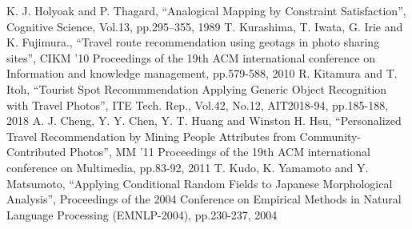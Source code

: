 \documentclass{deimj}
\begin{document}
\begin{thebibliography}{99}
  K. J. Holyoak and P. Thagard,
    ``Analogical Mapping by Constraint Satisfaction'',
    Cognitive Science, Vol.13, pp.295–355, 1989
  T. Kurashima, T. Iwata, G. Irie and K. Fujimura.,
    ``Travel route recommendation using geotags in photo sharing sites'',
    CIKM '10 Proceedings of the 19th ACM international conference on Information and knowledge management, pp.579-588, 2010
  R. Kitamura and T. Itoh,
    ``Tourist Spot Recommmendation Applying Generic Object Recognition with Travel Photos'',
    ITE Tech. Rep., Vol.42, No.12, AIT2018-94, pp.185-188, 2018
  A. J. Cheng, Y. Y. Chen, Y. T. Huang and Winston H. Hsu,
    ``Personalized Travel Recommendation by Mining People Attributes from Community-Contributed Photos'',
    MM '11 Proceedings of the 19th ACM international conference on Multimedia, pp.83-92, 2011
  T. Kudo, K. Yamamoto and Y. Matsumoto,
  ``Applying Conditional Random Fields to Japanese Morphological Analysis'',
  Proceedings of the 2004 Conference on Empirical Methods in Natural Language Processing (EMNLP-2004), pp.230-237, 2004
\end{thebibliography}
\end{document}
